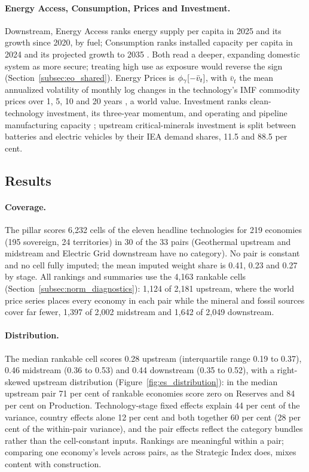 \paragraph{Energy Access, Consumption, Prices and Investment.}\label{subsec:es_access}%
\label{subsec:es_consumption}\label{subsec:es_prices}\label{subsec:es_investment}
Downstream, Energy Access ranks energy supply per capita in 2025 and its growth since 2020, by
fuel; Consumption ranks installed capacity per capita in 2024 and its projected growth to 2035
\citep{bnef2024neo}. Both read a deeper, expanding domestic system as more secure; treating high
use as exposure would reverse the sign (Section~\ref{subsec:eo_shared}). Energy Prices is
$\phi_{\gamma}[-\bar v_t]$, with $\bar v_t$ the mean annualized volatility of monthly log changes in the
technology's IMF commodity prices over 1, 5, 10 and 20 years \citep{imf2026pcps}, a world value.
Investment ranks clean-technology investment, its three-year momentum, and operating and pipeline
manufacturing capacity \citep{cim2026}; upstream critical-minerals investment is split between
batteries and electric vehicles by their IEA demand shares, 11.5 and 88.5 per cent.

\subsection{Results}\label{subsec:es_results}

\paragraph{Coverage.} The pillar scores 6{,}232 cells of the eleven headline technologies for 219
economies (195 sovereign, 24 territories) in 30 of the 33 pairs (Geothermal upstream and midstream
and Electric Grid downstream have no category). No pair is constant and no cell fully imputed; the
mean imputed weight share is 0.41, 0.23 and 0.27 by stage. All rankings and summaries use the 4{,}163 rankable cells
(Section~\ref{subsec:norm_diagnostics}): 1{,}124 of 2{,}181 upstream, where the world price series
places every economy in each pair while the mineral and fossil sources cover far fewer, 1{,}397 of
2{,}002 midstream and 1{,}642 of 2{,}049 downstream.

\paragraph{Distribution.} The median rankable cell scores 0.28 upstream (interquartile range 0.19
to 0.37), 0.46 midstream (0.36 to 0.53) and 0.44 downstream (0.35 to 0.52), with a right-skewed
upstream distribution (Figure~\ref{fig:es_distribution}): in the median upstream pair 71 per cent
of rankable economies score zero on Reserves and 84 per cent on Production. Technology-stage fixed
effects explain 44 per cent of the variance, country effects alone 12 per cent and both together
60 per cent (28 per cent of the within-pair variance), and the pair effects reflect the category
bundles rather than the cell-constant inputs. Rankings are meaningful within a pair; comparing one
economy's levels across pairs, as the Strategic Index does, mixes content with construction.

